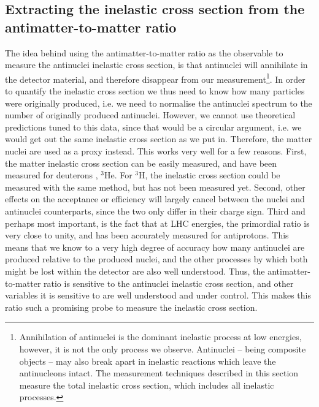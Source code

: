 \subsection{Extracting the inelastic cross section from the antimatter-to-matter ratio}
The idea behind using the antimatter-to-matter ratio as the observable to measure the antinuclei inelastic cross section, is that antinuclei will annihilate in the detector material, and therefore disappear from our measurement\footnote{Annihilation of antinuclei is the dominant inelastic process at low energies, however, it is not the only process we observe. Antinuclei -- being composite objects -- may also break apart in inelastic reactions which leave the antinucleons intact. The measurement techniques described in this section measure the total inelastic cross section, which includes all inelastic processes.}. In order to quantify the inelastic cross section we thus need to know how many particles were originally produced, i.e. we need to normalise the antinuclei spectrum to the number of originally produced antinuclei. However, we cannot use theoretical predictions tuned to this data, since that would be a circular argument, i.e. we would get out the same inelastic cross section as we put in. Therefore, the matter nuclei are used as a proxy instead. This works very well for a few reasons. First, the matter inelastic cross section can be easily measured, and have been measured for deuterons \cite{deuteron_cross_section}, $^3\mathrm{He}$\cite{chargeradius_helium}. For $^3\mathrm{H}$, the inelastic cross section could be measured with the same method, but has not been measured yet. Second, other effects on the  acceptance or efficiency will largely cancel between the nuclei and antinuclei counterparts, since the two only differ in their charge sign. Third and perhaps most important, is the fact that at LHC energies, the primordial ratio is very close to unity, and has been accurately measured for antiprotons\cite{Abbas_2013_primordial_ratio}. This means that we know to a very high degree of accuracy how many antinuclei are produced relative to the produced nuclei, and the other processes by which both might be lost within the detector are also well understood. Thus, the antimatter-to-matter ratio is sensitive to the antinuclei inelastic cross section, and other variables it is sensitive to are well understood and under control. This makes this ratio such a promising probe to measure the inelastic cross section.\\

